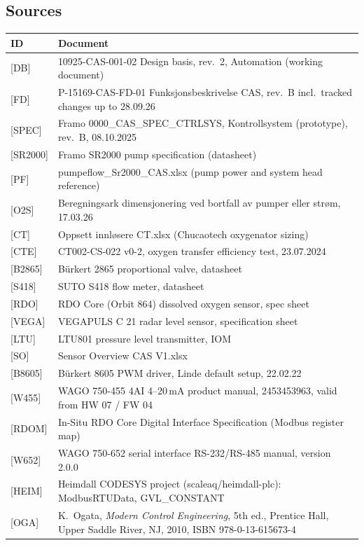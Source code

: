 \documentclass[11pt]{article}
\begin{document}
\subsection*{Sources}
\begin{tabularx}{\textwidth}{@{}lL@{}}
\toprule
ID & Document \\
\midrule
{[DB]}    & 10925-CAS-001-02 Design basis, rev.~2, Automation (working document) \\
{[FD]}    & P-15169-CAS-FD-01 Funksjonsbeskrivelse CAS, rev.~B incl.\ tracked changes up to 28.09.26 \\
{[SPEC]}  & Framo 0000\_CAS\_SPEC\_CTRLSYS, Kontrollsystem (prototype), rev.~B, 08.10.2025 \\
{[SR2000]}& Framo SR2000 pump specification (datasheet) \\
{[PF]}    & pumpeflow\_Sr2000\_CAS.xlsx (pump power and system head reference) \\
{[O2S]}   & Beregningsark dimensjonering ved bortfall av pumper eller strøm, 17.03.26 \\
{[CT]}    & Oppsett innløsere CT.xlsx (Chucaotech oxygenator sizing) \\
{[CTE]}   & CT002-CS-022 v0-2, oxygen transfer efficiency test, 23.07.2024 \\
{[B2865]} & Bürkert 2865 proportional valve, datasheet \\
{[S418]}  & SUTO S418 flow meter, datasheet \\
{[RDO]}   & RDO Core (Orbit 864) dissolved oxygen sensor, spec sheet \\
{[VEGA]}  & VEGAPULS C 21 radar level sensor, specification sheet \\
{[LTU]}   & LTU801 pressure level transmitter, IOM \\
{[SO]}    & Sensor Overview CAS V1.xlsx \\
{[B8605]} & Bürkert 8605 PWM driver, Linde default setup, 22.02.22 \\
{[W455]}  & WAGO 750-455 4AI 4--20\,mA product manual, 2453453963, valid from HW 07 / FW 04 \\
{[RDOM]}  & In-Situ RDO Core Digital Interface Specification (Modbus register map) \\
{[W652]}  & WAGO 750-652 serial interface RS-232/RS-485 manual, version 2.0.0 \\
{[HEIM]}  & Heimdall CODESYS project (scaleaq/heimdall-plc): ModbusRTUData, GVL\_CONSTANT \\
{[OGA]}   & K.~Ogata, \emph{Modern Control Engineering}, 5th ed., Prentice Hall, Upper Saddle River, NJ, 2010, ISBN 978-0-13-615673-4 \\

\end{tabularx}
\end{document}
